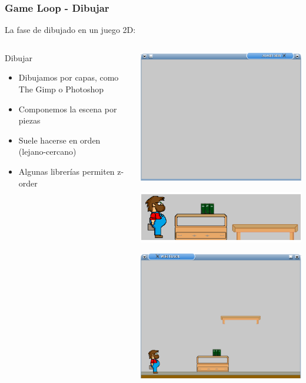 \begin{frame}
	\frametitle{Game Loop - Dibujar}
	
	La fase de dibujado en un juego 2D:
	
	\begin{columns}[c]
	\column{175pt}
		
	\begin{block}{Dibujar}
		\begin{itemize}
			\item Dibujamos por capas, como The Gimp o Photoshop
			\item Componemos la escena por piezas
			\item Suele hacerse en orden (lejano-cercano)
			\item Algunas librerías permiten z-order
		\end{itemize}            
	\end{block}
	
	\column{125pt}
	
	\begin{center}
		\includegraphics[scale=0.4]{img/pantalla.png}
		
		\includegraphics[scale=0.4]{img/elementos.png}
		
		\includegraphics[scale=0.4]{img/composicion.png}
	\end{center}	
	

\end{columns}
\end{frame}
